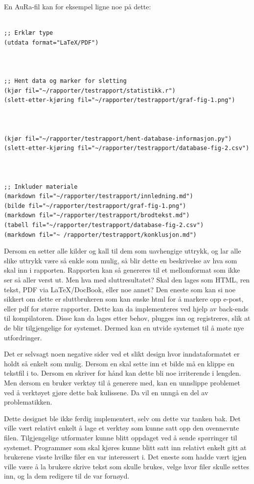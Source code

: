 \documentclass[norsk, 11pt, a4paper]{article}
\begin{document}
En AuRa-fil kan for eksempel ligne noe på dette:

\lstset{language=Lisp}
\begin{lstlisting}

;; Erklær type
(utdata format="LaTeX/PDF")



;; Hent data og marker for sletting
(kjør fil="~/rapporter/testrapport/statistikk.r")
(slett-etter-kjøring fil="~/rapporter/testrapport/graf-fig-1.png")



(kjør fil="~/rapporter/testrapport/hent-database-informasjon.py")
(slett-etter-kjøring fil="~/rapporter/testrapport/database-fig-2.csv")



;; Inkluder materiale
(markdown fil="~/rapporter/testrapport/innledning.md")
(bilde fil="~/rapporter/testrapport/graf-fig-1.png")
(markdown fil="~/rapporter/testrapport/brodtekst.md")
(tabell fil="~/rapporter/testrapport/database-fig-2.csv")
(markdown fil="~ /rapporter/testrapport/konklusjon.md")

\end{lstlisting}

Dersom en setter alle kilder og kall til dem som uavhengige uttrykk, og lar alle slike uttrykk være så enkle som mulig, så blir dette en beskrivelse av hva som skal inn i rapporten. Rapporten kan så genereres til et mellomformat som ikke ser så aller verst ut. Men hva med sluttresultatet? Skal den lages som HTML, ren tekst, PDF via LaTeX/DocBook, eller noe annet? Den eneste som kan si noe sikkert om dette er sluttbrukeren som kan ønske html for å markere opp e-post, eller pdf for større rapporter. 
Dette kan da implementeres ved hjelp av back-ends til kompilatoren. Disse kan da lages etter behov, plugges inn og registreres, slik at de blir tilgjengelige for systemet. Dermed kan en utvide systemet til å møte nye utfordringer.

Det er selvsagt noen negative sider ved et slikt design hvor inndataformatet er holdt så enkelt som mulig. Dersom en skal sette inn et bilde må en klippe en tekstfil i to. Dersom en skriver for hånd kan dette bli noe irriterende i lengden. Men dersom en bruker verktøy til å generere med, kan en unnslippe problemet ved å verktøyet gjøre dette bak kulissene. Da vil en unngå en del av problematikken. 

Dette designet ble ikke ferdig implementert, selv om dette var tanken bak. Det ville vært relativt enkelt å lage et verktøy som kunne satt opp den ovennevnte filen. Tilgjengelige utformater kunne blitt oppdaget ved å sende spørringer til systemet. Programmer som skal kjøres kunne blitt satt inn relativt enkelt gitt at brukerene visste hvilke filer en var interessert i. Det eneste som hadde vært igjen ville være å la brukere skrive tekst som skulle brukes, velge hvor filer skulle settes inn, og la dem redigere til de var fornøyd.
\end{document}
